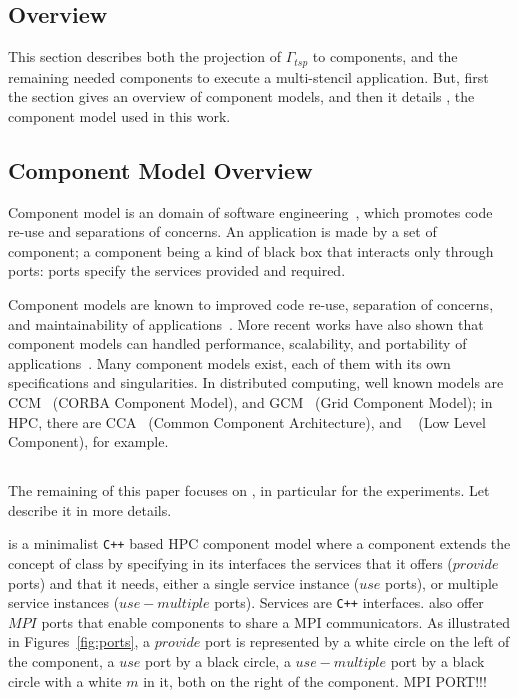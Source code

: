 \subsection{Overview}

This section describes both the projection of $\Gamma_{tsp}$ to
components, and the remaining needed components to execute a
multi-stencil application. But, first the section gives an overview of
component models, and then it details \llc, the component model used in
this work.


\subsection{Component Model Overview}
Component model is an domain of software
engineering~\cite{Szyperski:2002:CSB:515228}, which promotes code
re-use and separations of concerns. An application is made by a set of
component; a component being a kind of black box that interacts only
through ports: ports specify the services provided and required.

Component models are known to improved code re-use, separation of
concerns, and maintainability of
applications~\cite{Szyperski:2002:CSB:515228}. More recent works have
also shown that component models can handled performance, scalability,
and portability of applications~\cite{Bernholdt01052006,
  bigot:inria-00388508, l2c}. Many component models exist, each of
them with its own specifications and singularities. In distributed
computing, well known models are CCM~\cite{corba:omg06} (CORBA
Component Model), and GCM~\cite{Baude} (Grid Component Model); in HPC,
there are CCA~\cite{Bernholdt01052006} (Common Component
Architecture), and \llc~\cite{l2c} (Low Level Component), for example.

\subsection{\llc}

The remaining of this paper focuses on \llc, in particular for the
experiments. Let describe it in more details.

\llc is a minimalist \texttt{C++} based HPC component model where a
component extends the concept of class by specifying in its interfaces
the services that it offers ($provide$ ports) and that it needs,
either a single service instance ($use$ ports), or multiple service
instances ($use-multiple$ ports). Services are \texttt{C++}
interfaces. \llc also offer $MPI$ ports that enable components to
share a MPI communicators.
%
As illustrated in Figures~\ref{fig:ports}, a $provide$ port is
represented by a white circle on the left of the component, a $use$
port by a black circle, a $use-multiple$ port by a black circle with a
white $m$ in it, both on the right of the component. MPI PORT!!!

